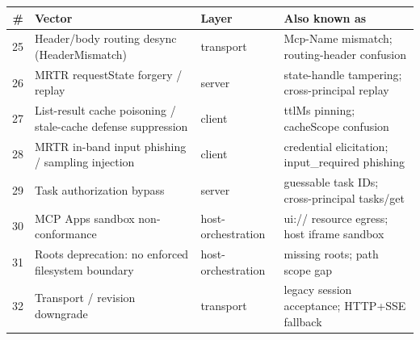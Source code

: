 \begin{tabular}{@{}rp{3.3cm}p{1.55cm}p{3.05cm}@{}}
\toprule
\# & Vector & Layer & Also known as \\
\midrule
25 & Header/body routing desync (HeaderMismatch) & transport & Mcp-Name mismatch; routing-header confusion \\
26 & MRTR requestState forgery / replay & server & state-handle tampering; cross-principal replay \\
27 & List-result cache poisoning / stale-cache defense suppression & client & ttlMs pinning; cacheScope confusion \\
28 & MRTR in-band input phishing / sampling injection & client & credential elicitation; input\_required phishing \\
29 & Task authorization bypass & server & guessable task IDs; cross-principal tasks/get \\
30 & MCP Apps sandbox non-conformance & host-orchestration & ui:// resource egress; host iframe sandbox \\
31 & Roots deprecation: no enforced filesystem boundary & host-orchestration & missing roots; path scope gap \\
32 & Transport / revision downgrade & transport & legacy session acceptance; HTTP+SSE fallback \\
\bottomrule
\end{tabular}
